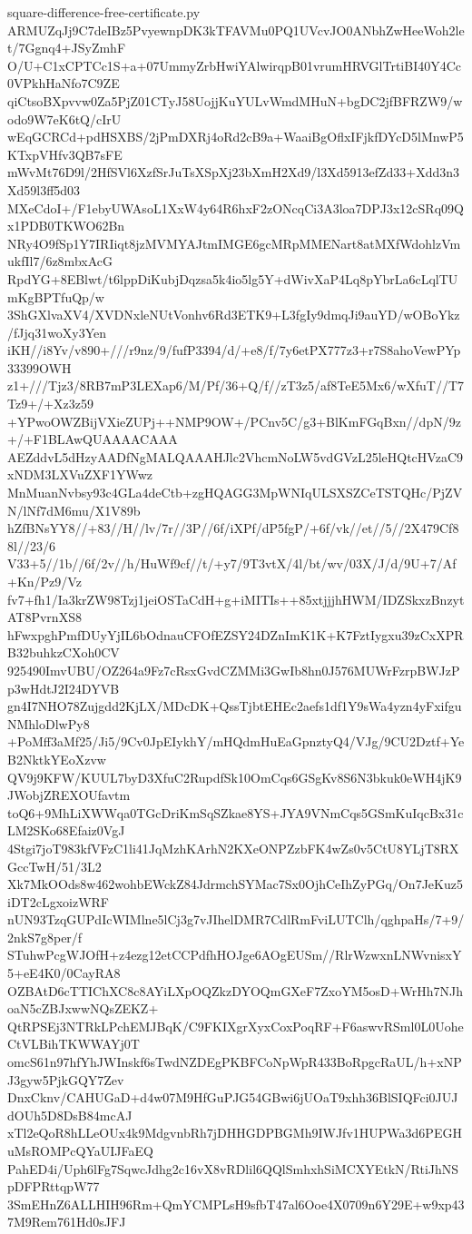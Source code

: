 \documentclass[11pt]{article}
\theoremstyle{definition}
\theoremstyle{remark}
\begin{document}
\begin{filecontents*}[overwrite]{square-difference-free-certificate.py}
ARMUZqJj9C7deIBz5PvyewnpDK3kTFAVMu0PQ1UVcvJO0ANbhZwHeeWoh2let/7Ggnq4+JSyZmhF
O/U+C1xCPTCc1S+a+07UmmyZrbHwiYAlwirqpB01vrumHRVGlTrtiBI40Y4Cc0VPkhHaNfo7C9ZE
qiCtsoBXpvvw0Za5PjZ01CTyJ58UojjKuYULvWmdMHuN+bgDC2jfBFRZW9/wodo9W7eK6tQ/cIrU
wEqGCRCd+pdHSXBS/2jPmDXRj4oRd2cB9a+WaaiBgOflxIFjkfDYcD5lMnwP5KTxpVHfv3QB7sFE
mWvMt76D9l/2HfSVl6XzfSrJuTsXSpXj23bXmH2Xd9/l3Xd5913efZd33+Xdd3n3Xd59l3ff5d03
MXeCdoI+/F1ebyUWAsoL1XxW4y64R6hxF2zONcqCi3A3loa7DPJ3x12cSRq09Qx1PDB0TKWO62Bn
NRy4O9fSp1Y7IRIiqt8jzMVMYAJtmIMGE6gcMRpMMENart8atMXfWdohlzVmukfIl7/6z8mbxAcG
RpdYG+8EBlwt/t6lppDiKubjDqzsa5k4io5lg5Y+dWivXaP4Lq8pYbrLa6cLqlTUmKgBPTfuQp/w
3ShGXlvaXV4/XVDNxleNUtVonhv6Rd3ETK9+L3fgIy9dmqJi9auYD/wOBoYkz/fJjq31woXy3Yen
iKH//i8Yv/v890+///r9nz/9/fufP3394/d/+e8/f/7y6etPX777z3+r7S8ahoVewPYp33399OWH
z1+///Tjz3/8RB7mP3LEXap6/M/Pf/36+Q/f//zT3z5/af8TeE5Mx6/wXfuT//T7Tz9+/+Xz3z59
+YPwoOWZBijVXieZUPj++NMP9OW+/PCnv5C/g3+BlKmFGqBxn//dpN/9z+/+F1BLAwQUAAAACAAA
AEZddvL5dHzyAADfNgMALQAAAHJlc2VhcmNoLW5vdGVzL25leHQtcHVzaC9xNDM3LXVuZXF1YWwz
MnMuanNvbsy93c4GLa4deCtb+zgHQAGG3MpWNIqULSXSZCeTSTQHc/PjZVN/lNf7dM6mu/X1V89b
hZfBNsYY8//+83//H//lv/7r//3P//6f/iXPf/dP5fgP/+6f/vk//et//5//2X479Cf88l//23/6
V33+5//1b//6f/2v//h/HuWf9cf//t/+y7/9T3vtX/4l/bt/wv/03X/J/d/9U+7/Af+Kn/Pz9/Vz
fv7+fh1/Ia3krZW98Tzj1jeiOSTaCdH+g+iMITIs++85xtjjjhHWM/IDZSkxzBnzytAT8PvrnXS8
hFwxpghPmfDUyYjIL6bOdnauCFOfEZSY24DZnImK1K+K7FztIygxu39zCxXPRB32buhkzCXoh0CV
925490ImvUBU/OZ264a9Fz7cRsxGvdCZMMi3GwIb8hn0J576MUWrFzrpBWJzPp3wHdtJ2I24DYVB
gn4I7NHO78Zujgdd2KjLX/MDcDK+QssTjbtEHEc2aefs1df1Y9sWa4yzn4yFxifguNMhloDlwPy8
+PoMff3aMf25/Ji5/9Cv0JpEIykhY/mHQdmHuEaGpnztyQ4/VJg/9CU2Dztf+YeB2NktkYEoXzvw
QV9j9KFW/KUUL7byD3XfuC2RupdfSk10OmCqs6GSgKv8S6N3bkuk0eWH4jK9JWobjZREXOUfavtm
toQ6+9MhLiXWWqa0TGcDriKmSqSZkae8YS+JYA9VNmCqs5GSmKuIqcBx31cLM2SKo68Efaiz0VgJ
4Stgi7joT983kfVFzC1li41JqMzhKArhN2KXeONPZzbFK4wZs0v5CtU8YLjT8RXGccTwH/51/3L2
Xk7MkOOds8w462wohbEWckZ84JdrmchSYMac7Sx0OjhCeIhZyPGq/On7JeKuz5iDT2cLgxoizWRF
nUN93TzqGUPdIcWIMlne5lCj3g7vJIhelDMR7CdlRmFviLUTClh/qghpaHs/7+9/2nkS7g8per/f
STuhwPcgWJOfH+z4ezg12etCCPdfhHOJge6AOgEUSm//RlrWzwxnLNWvnisxY5+eE4K0/0CayRA8
OZBAtD6cTTIChXC8c8AYiLXpOQZkzDYOQmGXeF7ZxoYM5osD+WrHh7NJhoaN5cZBJxwwNQsZEKZ+
QtRPSEj3NTRkLPchEMJBqK/C9FKIXgrXyxCoxPoqRF+F6aswvRSml0L0UoheCtVLBihTKWWAYj0T
omcS61n97hfYhJWInskf6sTwdNZDEgPKBFCoNpWpR433BoRpgcRaUL/h+xNPJ3gyw5PjkGQY7Zev
DnxCknv/CAHUGaD+d4w07M9HfGuPJG54GBwi6jUOaT9xhh36BlSIQFci0JUJdOUh5D8DsB84mcAJ
xTl2eQoR8hLLeOUx4k9MdgvnbRh7jDHHGDPBGMh9IWJfv1HUPWa3d6PEGHuMsROMPcQYaUIJFaEQ
PahED4i/Uph6lFg7SqwcJdhg2c16vX8vRDlil6QQlSmhxhSiMCXYEtkN/RtiJhNSpDFPRttqpW77
3SmEHnZ6ALLHIH96Rm+QmYCMPLsH9sfbT47al6Ooe4X0709n6Y29E+w9xp437M9Rem761Hd0sJFJ

\end{filecontents*}
\end{document}

